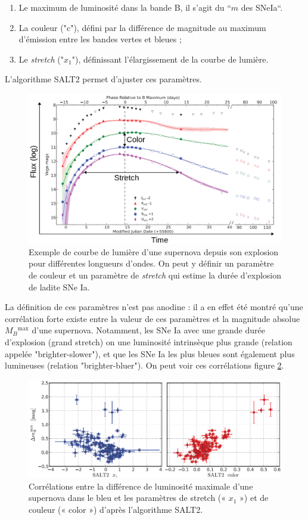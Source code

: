 \documentclass[a4paper, 12pt, svgnames]{article}
\newcommand{\mr}[1]{{\textcolor[rgb]{0.80,0.10,0.1}{#1}}}
\begin{document}
\begin{enumerate}
    \item \mr{Le maximum de luminosité dans la bande B, il s'agit du “$m$ des
        SNeIa“.}
    \item La couleur ("c"), défini par la différence de magnitude au maximum
        d'émission entre les bandes vertes et bleues ;
    \item Le \textit{stretch} ("$x_1$"), définissant l'élargissement de la
        courbe de lumière.
\end{enumerate}

\mr{L'algorithme SALT2 \cite{guy2007,guy2010} permet d'ajuster ces paramètres.}

\begin{figure}[htbp!]
    \centering
    \includegraphics[width=.5\linewidth]{Rapport_figures/lightcurve.png}
    \captionsetup{justification=centering}
    \caption{Exemple de courbe de lumière d'une supernova depuis son explosion
    pour différentes longueurs d'ondes. On peut y définir un paramètre de
couleur et un paramètre de \textit{stretch} qui estime la durée d'explosion de
ladite SNe Ia.}
    \label{lightcurves}
\end{figure}

La définition de ces paramètres n'est pas anodine : il a en effet été montré
qu'une corrélation forte existe entre la valeur de ces paramètres et la
magnitude absolue $M_B{}^{\text{max}}$ d'une supernova. Notamment, les SNe Ia
avec une grande durée d'explosion (grand stretch) on une luminosité intrinsèque
plus grande (relation appelée "brighter-slower"), et que les SNe Ia les plus
bleues sont également plus lumineuses (relation "brighter-bluer"). On peut voir
ces corrélations figure \ref{brighter_slower_bluer}.

\begin{figure}[htbp!]
    \centering
    \includegraphics[width=.7\linewidth]{Rapport_figures/disp_x1_c.PNG}
    \captionsetup{justification=centering}
    \caption{Corrélations entre la différence de luminosité maximale d'une
    supernova dans le bleu et les paramètres de stretch (« $x_1$ ») et de
couleur (« color ») d'après l'algorithme SALT2.}
    \label{brighter_slower_bluer}
\end{figure}
\end{document}
